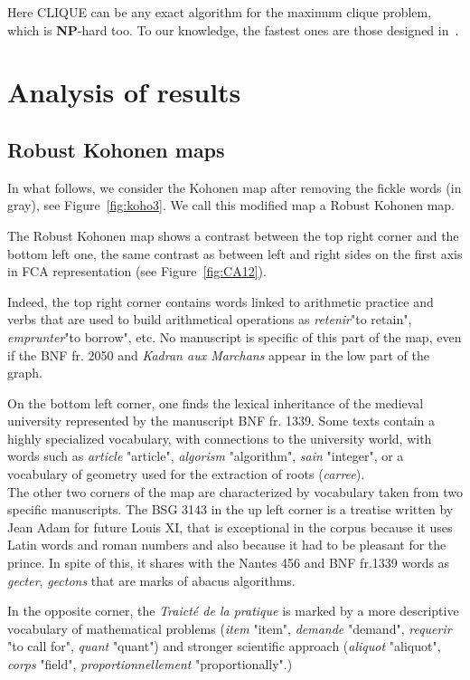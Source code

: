 \documentclass[preprint]{elsarticle}
\begin{document}
Here CLIQUE can be any exact algorithm for the maximum clique problem, which is \textbf{NP}-hard too. To our knowledge, the fastest ones are those designed in~\cite{exactis}.\\

\section{Analysis of results}\label{analysis}

\subsection{Robust Kohonen maps}

In what follows, we consider the Kohonen map after removing the fickle words (in gray), see Figure~\ref{fig:koho3}. We call this modified map a Robust Kohonen map. 

The Robust Kohonen map shows a contrast between the top right corner and the bottom left one, the same contrast as between left and right sides on the first axis in FCA representation (see Figure~\ref{fig:CA12}).

Indeed, the top right corner contains words linked to arithmetic practice and verbs that are used to build arithmetical operations as \textit{retenir}"to retain", \textit{emprunter}"to borrow", etc. No manuscript is specific of this part of the map, even if the BNF fr. 2050 and \textit{Kadran aux Marchans} appear in the low part of the graph. 

On the bottom left corner, one finds the lexical inheritance of the medieval university  represented by the manuscript BNF fr. 1339. Some texts contain a highly specialized vocabulary, with connections to the university world, with words such as \textit{article} "article", \textit{algorism} "algorithm", \textit{sain} "integer", or a vocabulary of geometry used for the extraction of roots (\textit{carree}).\\

The other two corners of the map are characterized by vocabulary taken from two specific manuscripts. The BSG 3143 in the up left corner is a treatise written by Jean Adam for future Louis XI, that is exceptional in the corpus because it uses Latin words and roman numbers and also because it had to be pleasant for the prince. In spite of this, it shares with the Nantes 456 and BNF fr.1339 words as \textit{gecter}, \textit{gectons} that are marks of abacus algorithms.

In the opposite corner, the \textit{Traicté de la pratique} is marked by a more descriptive vocabulary of mathematical problems (\textit{item} "item", \textit{demande} "demand", \textit{requerir} "to call for", \textit{quant} "quant")  and stronger scientific approach (\textit{aliquot} "aliquot", \textit{corps} "field", \textit{proportionnellement} "proportionally".)\\
\end{document}
